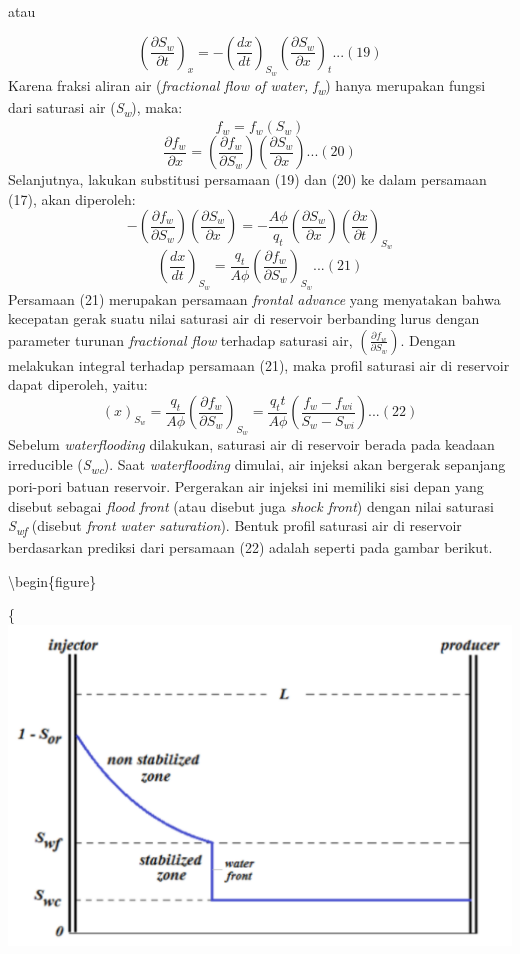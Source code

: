 \documentclass[
]{book}
\begin{document}
atau

\[ \left( \frac{\partial S_w}{\partial t} \right)_x = -\left( \frac{dx}{dt} \right)_{S_w} \left( \frac{\partial S_w}{\partial x} \right)_t ...(19)\]
Karena fraksi aliran air (\emph{fractional flow of water, f\textsubscript{w}}) hanya merupakan fungsi dari saturasi air (\emph{S\textsubscript{w}}), maka:
\[f_w = f_w (S_w)\]
\[ \frac{\partial f_w}{\partial x} = \left( \frac{\partial f_w}{\partial S_w} \right) \left( \frac{\partial S_w}{\partial x} \right)...(20) \]
Selanjutnya, lakukan substitusi persamaan (19) dan (20) ke dalam persamaan (17), akan diperoleh:
\[ -\left( \frac{\partial f_w}{\partial S_w} \right) \left( \frac{\partial S_w}{\partial x} \right) = -\frac{A\phi}{q_t} \left( \frac{\partial S_w}{\partial x} \right) \left( \frac{\partial x}{\partial t} \right)_{S_w} \]
\[ \left( \frac{dx}{dt} \right)_{S_w} = \frac{q_t}{A\phi} \left( \frac{\partial f_w}{\partial S_w} \right)_{S_w}...(21)\]
Persamaan (21) merupakan persamaan \emph{frontal advance} yang menyatakan bahwa kecepatan gerak suatu nilai saturasi air di reservoir berbanding lurus dengan parameter turunan \emph{fractional flow} terhadap saturasi air, \(\left( \frac{\partial f_w}{\partial S_w} \right)\). Dengan melakukan integral terhadap persamaan (21), maka profil saturasi air di reservoir dapat diperoleh, yaitu:
\[(x)_{S_w} = \frac{q_t}{A\phi} \left( \frac{\partial f_w}{\partial S_w} \right)_{S_w} = \frac{q_tt}{A\phi} \left( \frac{f_w - f_{wi}}{S_w - S_{wi}} \right)...(22)\]
Sebelum \emph{waterflooding} dilakukan, saturasi air di reservoir berada pada keadaan irreducible (\emph{S\textsubscript{wc}}). Saat \emph{waterflooding} dimulai, air injeksi akan bergerak sepanjang pori-pori batuan reservoir. Pergerakan air injeksi ini memiliki sisi depan yang disebut sebagai \emph{flood front} (atau disebut juga \emph{shock front}) dengan nilai saturasi \emph{S\textsubscript{wf}} (disebut \emph{front water saturation}). Bentuk profil saturasi air di reservoir berdasarkan prediksi dari persamaan (22) adalah seperti pada gambar berikut.

\textbackslash begin\{figure\}

\{\centering \includegraphics[width=0.5\linewidth]{images/waterflood/saturasiair}
\end{document}
